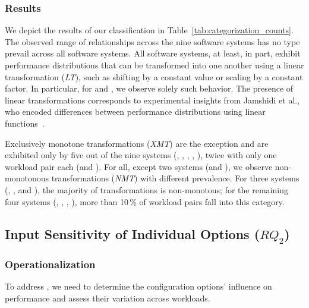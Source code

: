 {{\subsubsection{Results}
{\color{edited}
We depict the results of our classification in Table~\ref{tab:categorization_counts}. The observed range of relationships across the nine software systems has no type prevail across all software systems. 
All software systems, at least, in part, exhibit performance distributions that can be transformed into one another using a linear transformation (\textit{\colorbox{lt-color}{LT}}), such as shifting by a constant value or scaling by a constant factor. In particular, for \jumper and \xzwo, we observe solely such behavior. The presence of linear transformations corresponds to experimental insights from Jamshidi et al., who encoded differences between performance distributions using linear functions~\cite{jamishidi_transfer_2017}.

Exclusively monotone transformations (\textit{\colorbox{xmt-color}{XMT}}) are the exception and are exhibited only by five out of the nine systems (\kanzi, \batik, \xz, \lrzip, \zdrei), twice with only one workload pair each (\xz and \zdrei).  
For all, except two systems (\jumper and \xzwo), we observe non-monotonous transformations (\textit{\colorbox{nmt-color}{NMT}}) with different prevalence.  For three systems (\dconvert, \htwo, and \zdrei), the majority of transformations is non-monotous; for the remaining four systems (\kanzi, \batik, \xz, \lrzip), more than 10\,\% of workload pairs fall into this category.

\vspace{1mm}

\subsection{Input Sensitivity of Individual Options ($RQ_2$)}\label{sec:rq2}

\subsubsection{Operationalization}
To address , we need to determine the configuration options’ influence on performance and assess their variation across workloads. 

}}}
